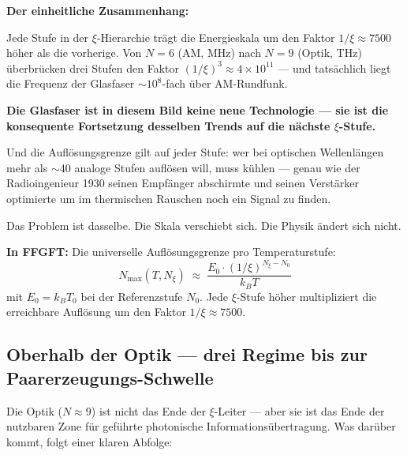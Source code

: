 \begin{foundation}
\medskip
\textbf{Der einheitliche Zusammenhang:}

Jede Stufe in der $\xi$-Hierarchie trägt die Energieskala
um den Faktor $1/\xi \approx 7500$ höher als die vorherige.
Von $N = 6$ (AM, MHz) nach $N = 9$ (Optik, THz)
überbrücken drei Stufen den Faktor
$(1/\xi)^3 \approx 4 \times 10^{11}$ ---
und tatsächlich liegt die Frequenz der Glasfaser
$\sim 10^8$-fach über AM-Rundfunk.

\textbf{Die Glasfaser ist in diesem Bild keine neue Technologie ---
sie ist die konsequente Fortsetzung desselben Trends
auf die nächste $\xi$-Stufe.}

Und die Auflösungsgrenze gilt auf jeder Stufe:
wer bei optischen Wellenlängen mehr als $\sim$40 analoge
Stufen auflösen will, muss kühlen ---
genau wie der Radioingenieur 1930 seinen Empfänger
abschirmte und seinen Verstärker optimierte um
im thermischen Rauschen noch ein Signal zu finden.

Das Problem ist dasselbe. Die Skala verschiebt sich.
Die Physik ändert sich nicht.

\textbf{In FFGFT:}
Die universelle Auflösungsgrenze pro Temperaturstufe:
\begin{equation}
  \boxed{N_\text{max}(T, N_\xi)
  \;\approx\;
  \frac{E_0 \cdot (1/\xi)^{N_\xi - N_0}}{k_B T}}
\end{equation}
mit $E_0 = k_B T_0$ bei der Referenzstufe $N_0$.
Jede $\xi$-Stufe höher multipliziert die
erreichbare Auflösung um den Faktor $1/\xi \approx 7500$.
\end{foundation}

\subsection{Oberhalb der Optik --- drei Regime bis zur Paarerzeugungs-Schwelle}
\label{sec:oberhalb-optik}

Die Optik ($N \approx 9$) ist nicht das Ende der $\xi$-Leiter ---
aber sie ist das Ende der nutzbaren Zone für
geführte photonische Informationsübertragung.
Was darüber kommt, folgt einer klaren Abfolge:

